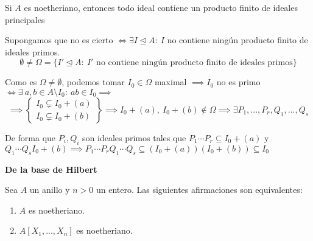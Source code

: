 \documentclass[openany]{book}
\begin{document}
\begin{proposition}
    Si $ A $ es noetheriano, entonces todo ideal contiene un producto finito de ideales principales
\end{proposition}


\begin{demonstration}
    Supongamos que no es cierto $ \iff \exists I \unlhd A:\ I $ no contiene ningún producto finito de ideales primos.
    $$ \emptyset \ne \Omega = \{I' \unlhd A:\ I' \text{ no contiene ningún producto finito de ideales primos}\} $$

    Como es $ \Omega \ne \emptyset $, podemos tomar $ I_0 \in \Omega  $ maximal $ \implies I_0 $ no es primo $ \iff \exists\ a,b \in A \setminus I_0:\ ab \in I_0 \implies  $
    $$ \implies \left\{
    \begin{array}{l}
        I_0 \subsetneq I_0+(a)\\
        I_0 \subsetneq I_0+(b)
    \end{array}
    \right\} \implies I_0+(a) ,\ I_0+(b) \not \in \Omega \implies \exists P_1,...,P_{r}, Q_1,...,Q_{s}  $$

    De forma que $ P_i,Q_i $ son ideales primos tales que $ P_1\cdots P_{r}\subseteq I_0+(a)  $ y $ Q_1\cdots Q_{s} I_0+(b) \implies P_1\cdots P_{r}Q_{1}\cdots Q_{s} \subseteq  (I_0+(a))(I_0+(b))\subseteq I_0$
\end{demonstration}

\begin{theorem}
    \textbf{De la base de Hilbert}

    Sea $ A  $ un anillo y $ n > 0 $ un entero. Las siguientes afirmaciones son equivalentes:
    \begin{enumerate}
        \item $ A $ es noetheriano.
        \item $ A[X_1,...,X_n] $ es noetheriano.
    \end{enumerate}
\end{theorem}
\end{document}
